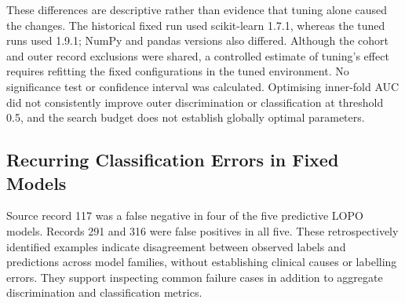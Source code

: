 These differences are descriptive rather than evidence that tuning alone caused the changes. The historical fixed run used scikit-learn 1.7.1, whereas the tuned runs used 1.9.1; NumPy and pandas versions also differed. Although the cohort and outer record exclusions were shared, a controlled estimate of tuning's effect requires refitting the fixed configurations in the tuned environment. No significance test or confidence interval was calculated. Optimising inner-fold AUC did not consistently improve outer discrimination or classification at threshold 0.5, and the search budget does not establish globally optimal parameters.

\subsection{Recurring Classification Errors in Fixed Models}
Source record 117 was a false negative in four of the five predictive LOPO models. Records 291 and 316 were false positives in all five. These retrospectively identified examples indicate disagreement between observed labels and predictions across model families, without establishing clinical causes or labelling errors. They support inspecting common failure cases in addition to aggregate discrimination and classification metrics.


